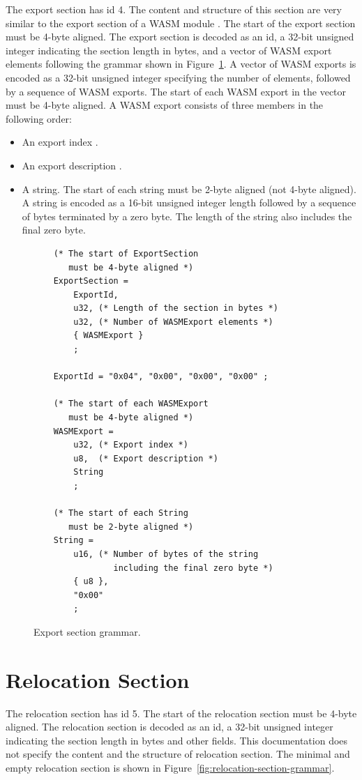 \documentclass{article}
\begin{document}
The export section has id 4.
The content and structure of this section are very similar to the export section
of a WASM module \cite[Sec.~5.5.10]{webassembly2019core}.
The start of the export section must be 4-byte aligned.
The export section is decoded as an id, a 32-bit unsigned integer indicating the
section length in bytes, and a vector of WASM export elements following the
grammar shown in Figure~\ref{figure:export-section-grammar}.
A vector of WASM exports is encoded as a 32-bit unsigned integer specifying the
number of elements, followed by a sequence of WASM exports.
The start of each WASM export in the vector must be 4-byte aligned.
A WASM export consists of three members in the following order:
\begin{itemize}
    \item An export index \cite[Sec.~5.5.10]{webassembly2019core}.
    \item An export description \cite[Sec.~5.5.10]{webassembly2019core}.
    \item A string. The start of each string must be 2-byte aligned (not 4-byte aligned).
          A string is encoded as a 16-bit unsigned integer length followed by a
          sequence of bytes terminated by a zero byte.
          The length of the string also includes the final zero byte.
\end{itemize}

\begin{figure}[H]
\begin{verbatim}
    (* The start of ExportSection
       must be 4-byte aligned *)
    ExportSection =
        ExportId,
        u32, (* Length of the section in bytes *)
        u32, (* Number of WASMExport elements *)
        { WASMExport }
        ;

    ExportId = "0x04", "0x00", "0x00", "0x00" ;

    (* The start of each WASMExport
       must be 4-byte aligned *)
    WASMExport =
        u32, (* Export index *)
        u8,  (* Export description *)
        String
        ;

    (* The start of each String
       must be 2-byte aligned *)
    String =
        u16, (* Number of bytes of the string
                including the final zero byte *)
        { u8 },
        "0x00"
        ;
\end{verbatim}
\caption{Export section grammar.}
\label{figure:export-section-grammar}
\end{figure}

\section{Relocation Section}
The relocation section has id 5.
The start of the relocation section must be 4-byte aligned.
The relocation section is decoded as an id, a 32-bit unsigned integer indicating the section length in bytes and other fields.
This documentation does not specify the content and the structure of relocation section.
The minimal and empty relocation section is shown in Figure~\ref{fig:relocation-section-grammar}.
\end{document}
